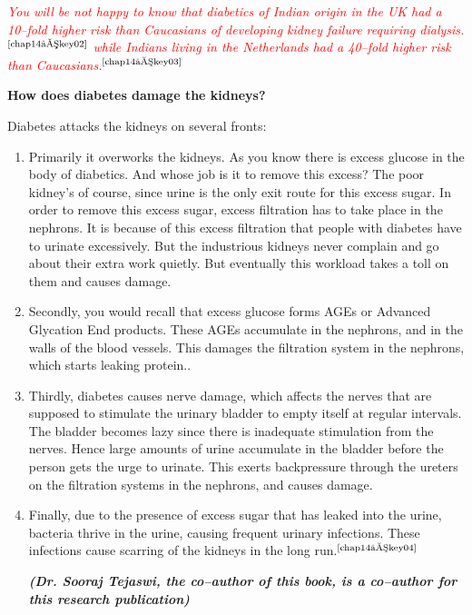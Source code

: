 \textcolor{red}{\textit{You will be not happy to know that diabetics of Indian origin in the UK had a 10–fold higher risk than Caucasians of developing kidney failure requiring dialysis.}}$^{\text{\cite{chap14–key02}}}$ \textcolor{red}{\textit{while Indians living in the Netherlands had a 40–fold higher risk than Caucasians.}}$^{\text{\cite{chap14–key03}}}$

\noindent\textbf{How does diabetes damage the kidneys?}

\noindent Diabetes attacks the kidneys on several fronts:

\begin{enumerate}[\ding{118}]
\itemsep=0pt
\item Primarily it overworks the kidneys. As you know there is excess glucose in the body of diabetics. And whose job is it to remove this excess? The poor kidney’s of course, since urine is the only exit route for this excess sugar. In order to remove this excess sugar, excess filtration has to take place in the nephrons. It is because of this excess filtration that people with diabetes have to urinate exce\-ssively. But the industrious kidneys never complain and go about their extra work quietly. But eventually this workload takes a toll on them and causes damage.
\item Secondly, you would recall that excess glucose forms AGEs or Adva\-nced Glycation End products. These AGEs accumulate in the neph\-rons, and in the walls of the blood vessels. This damages the filtration system in the nephrons, which starts leaking protein..
\item Thirdly, diabetes causes nerve damage, which affects the nerves that are supposed to stimulate the urinary bladder to empty itself at regular intervals. The bladder becomes lazy since there is ina\-dequate stimulation from the nerves. Hence large amounts of urine accumulate in the bladder before the person gets the urge to urinate. This exerts backpressure through the ureters on the filtration systems in the nephrons, and causes damage.
\item Finally, due to the presence of excess sugar that has leaked into the urine, bacteria thrive in the urine, causing frequent urinary infe\-ctions. These infections cause scarring of the kidneys in the long run.$^{\text{\cite{chap14–key04}}}$

 \textbf{\textit{(Dr. Sooraj Tejaswi, the co–author of this book, is a co–author for this research publication)}}
 \end{enumerate}



